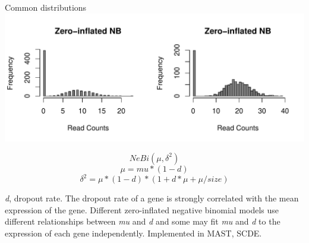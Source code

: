 \documentclass{beamer}\usepackage[]{graphicx}\usepackage[]{color}
\makeatletter
\def\maxwidth{ %
  \ifdim\Gin@nat@width>\linewidth
    \linewidth
  \else
    \Gin@nat@width
  \fi
}
\newenvironment{knitrout}{}{} %
\makeatother
\begin{document}
\begin{frame}
\begin{block}{Common distributions} %
\begin{knitrout}
\color{fgcolor}
\includegraphics[width=\maxwidth]{figure/dist-zero-inlated-NB-1} 

\end{knitrout}

\tiny
$$NeBi(\mu, \delta^2)$$
$$\mu=mu*(1-d)$$
$$\delta^2=\mu*(1-d)*(1+d*\mu+\mu/size)$$

\textit{d}, dropout rate. The dropout rate of a gene is strongly correlated with the mean expression of the gene. Different zero-inflated negative binomial models use different relationships between \textit{mu} and \textit{d} and some may fit \textit{mu} and \textit{d} to the expression of each gene independently. Implemented in MAST, SCDE. 
\end{block}
\end{frame}
\end{document}
